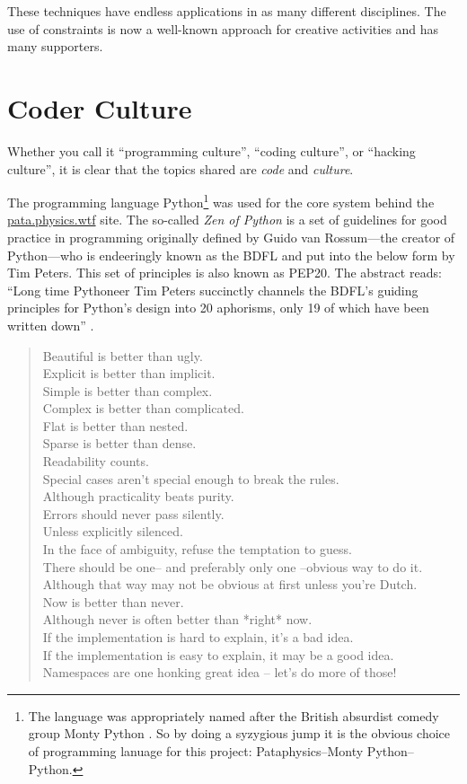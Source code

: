 These techniques have endless applications in as many different disciplines. The use of constraints is now a well-known approach for creative activities and has many supporters.


\section{Coder Culture}
\label{s:culture}

Whether you call it ``programming culture'', ``coding culture'', or ``hacking culture'', it is clear that the topics shared are \emph{code} and \emph{culture}.

The programming language Python\footnote{The language was appropriately named after the British absurdist comedy group Monty Python \autocite{Python2016}. So by doing a syzygious jump it is the obvious choice of programming lanuage for this project: Pataphysics--Monty Python--Python.} was used for the core system behind the \url{pata.physics.wtf} site. The so-called \textit{Zen of Python} is a set of guidelines for good practice in programming originally defined by Guido van Rossum---the creator of Python---who is endeeringly known as the \ac{BDFL} and put into the below form by Tim Peters. This set of principles is also known as \acs{PEP}20. The abstract reads: ``Long time Pythoneer Tim Peters succinctly channels the \ac{BDFL}'s guiding principles for Python's design into 20 aphorisms, only 19 of which have been written down'' \autocite*{PEP20}.

\begin{quotation}
  Beautiful is better than ugly.\\
  Explicit is better than implicit.\\
  Simple is better than complex.\\
  Complex is better than complicated.\\
  Flat is better than nested.\\
  Sparse is better than dense.\\
  Readability counts.\\
  Special cases aren't special enough to break the rules.\\
  Although practicality beats purity.\\
  Errors should never pass silently.\\
  Unless explicitly silenced.\\
  In the face of ambiguity, refuse the temptation to guess.\\
  There should be one-- and preferably only one --obvious way to do it.\\
  Although that way may not be obvious at first unless you're Dutch.\\
  Now is better than never.\\
  Although never is often better than *right* now.\\
  If the implementation is hard to explain, it's a bad idea.\\
  If the implementation is easy to explain, it may be a good idea.\\
  Namespaces are one honking great idea -- let's do more of those!
\end{quotation}

